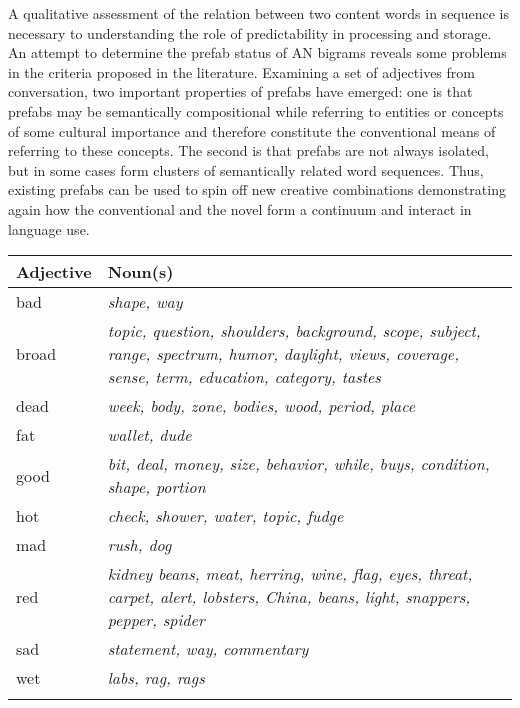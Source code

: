 \documentclass[output=paper]{langscibook}
\begin{document}
A qualitative assessment of the relation between two content words in sequence is necessary to understanding the role of predictability in processing and storage. An attempt to determine the prefab status of AN bigrams reveals some problems in the criteria proposed in the literature. Examining a set of adjectives from conversation, two important properties of prefabs have emerged: one is that prefabs may be semantically compositional while referring to entities or concepts of some cultural importance and therefore constitute the conventional means of referring to these concepts. The second is that prefabs are not always isolated, but in some cases form clusters of semantically related word sequences. Thus, existing prefabs can be used to spin off new creative combinations demonstrating again how the conventional and the novel form a continuum and interact in language use. 

\label{sec:bybee:Appendix1}


\begin{tabularx}{\textwidth}{lQ}
\lsptoprule
Adjective & Noun(s)\\
\midrule
bad & \textit{shape, way}\\
\tablevspace
broad & \textit{topic, question, shoulders, background, scope, subject, range, spectrum, humor, daylight, views, coverage, sense, term, education, category, tastes}\\
\tablevspace
dead & \textit{week, body, zone, bodies, wood, period, place}\\
\tablevspace
fat & \textit{wallet, dude}\\
\tablevspace
good & \textit{bit, deal, money, size, behavior, while, buys, condition, shape, portion}\\
\tablevspace
hot & \textit{check, shower, water, topic, fudge}\\
\tablevspace
mad & \textit{rush, dog}\\
\tablevspace
red & \textit{kidney beans, meat, herring, wine, flag, eyes, threat, carpet, alert, lobsters, China, beans, light, snappers, pepper, spider}\\
\tablevspace
sad & \textit{statement, way, commentary}\\
\tablevspace
wet & \textit{labs, rag, rags}\\
\lspbottomrule
\end{tabularx}

\label{sec:bybee:Appendix2}
\end{document}
